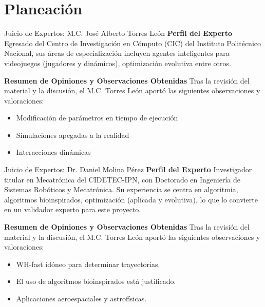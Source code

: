 \section{Planeación}

\begin{frame}{Juicio de Expertos: M.C. José Alberto Torres León}
  \textbf{Perfil del Experto}
  \RaggedRight
  \scriptsize
  Egresado del Centro de Investigación en Cómputo (CIC) del Instituto Politécnico Nacional, sus áreas de especialización
  incluyen agentes inteligentes para videojuegos (jugadores y dinámicos), optimización evolutiva entre otros.

  \bigskip

  \textbf{Resumen de Opiniones y Observaciones Obtenidas}
  \RaggedRight
  \scriptsize
  Tras la revisión del material y la discusión, el M.C. Torres León aportó las siguientes observaciones y valoraciones:
  \begin{itemize}
    \item Modificación de parámetros en tiempo de ejecución
    \item Simulaciones apegadas a la realidad
    \item Interacciones dinámicas
  \end{itemize}
\end{frame}

\begin{frame}{Juicio de Expertos: Dr. Daniel Molina Pérez}
  \textbf{Perfil del Experto}
  \RaggedRight
  \scriptsize
  Investigador titular en Mecatrónica del CIDETEC-IPN, con Doctorado en Ingeniería de Sistemas Robóticos y Mecatrónica. Su experiencia se centra en algoritmia, algoritmos bioinspirados, optimización (aplicada y evolutiva), lo que lo convierte en un validador experto para este proyecto.

  \bigskip

  \textbf{Resumen de Opiniones y Observaciones Obtenidas}
  \RaggedRight
  \scriptsize
  Tras la revisión del material y la discusión, el M.C. Torres León aportó las siguientes observaciones y valoraciones:
  \begin{itemize}
    \item WH-fast idóneo para determinar trayectorias.
    \item El uso de algoritmos bioinspirados está justificado.
    \item Aplicaciones aeroespaciales y astrofísicas.
  \end{itemize}
\end{frame}

